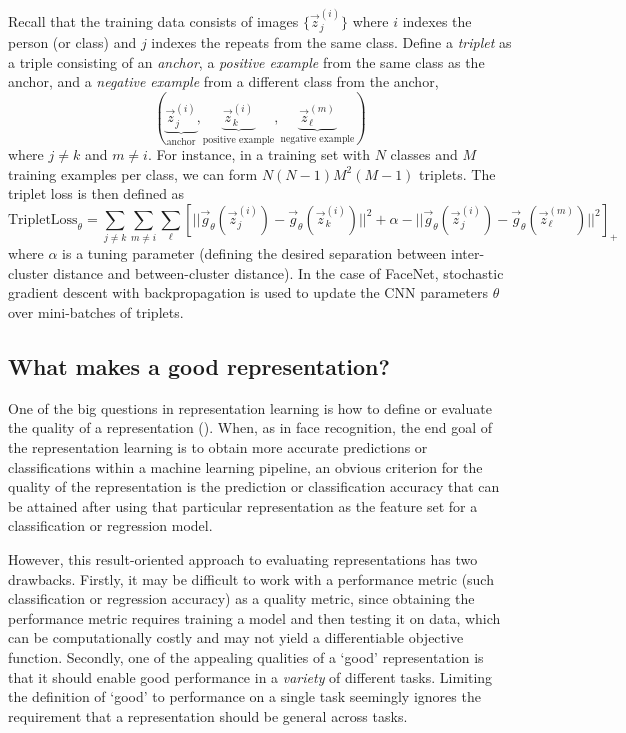 Recall that the training data consists of images $\{\vec{z}_j^{(i)}\}$
where $i$ indexes the person (or class) and $j$ indexes the repeats
from the same class.  Define a \emph{triplet} as a triple consisting
of an \emph{anchor}, a \emph{positive example} from the same class as
the anchor, and a \emph{negative example} from a different class from
the anchor,
\[
(\underbrace{\vec{z}_j^{(i)}}_{\text{anchor}}, \underbrace{\vec{z}_k^{(i)}}_{\text{positive example}}, \underbrace{\vec{z}_\ell^{(m)}}_{\text{negative example}})
\]
where $j \neq k$ and $m \neq i$.  For instance, in a training set with
$N$ classes and $M$ training examples per class, we can form
$N(N-1)M^2(M-1)$ triplets.  The triplet loss is then defined as
\[
\text{TripletLoss}_{\theta} = \sum_{j \neq k} \sum_{m \neq i} \sum_\ell 
[||\vec{g}_\theta(\vec{z}_j^{(i)}) - \vec{g}_\theta(\vec{z}_k^{(i)})||^2 + \alpha
 - ||\vec{g}_\theta(\vec{z}_j^{(i)}) - \vec{g}_\theta(\vec{z}_\ell^{(m)})||^2]_+
\]
where $\alpha$ is a tuning parameter (defining the desired separation
between inter-cluster distance and between-cluster distance).  In the
case of FaceNet, stochastic gradient descent with backpropagation is
used to update the CNN parameters $\theta$ over mini-batches of
triplets.

\subsection{What makes a good representation?}

One of the big questions in representation learning is how to define
or evaluate the quality of a
representation (\cite{bengio2013representation}).  When, as in face
recognition, the end goal of the representation learning is to obtain
more accurate predictions or classifications within a machine learning
pipeline, an obvious criterion for the quality of the representation
is the prediction or classification accuracy that can be attained
after using that particular representation as the feature set for a
classification or regression model.

However, this result-oriented approach to evaluating representations
has two drawbacks.  Firstly, it may be difficult to work with a
performance metric (such classification or regression accuracy) as a
quality metric, since obtaining the performance metric requires
training a model and then testing it on data, which can be
computationally costly and may not yield a differentiable objective
function.  Secondly, one of the appealing qualities of a `good'
representation is that it should enable good performance in a
\emph{variety} of different tasks.  Limiting the definition of `good'
to performance on a single task seemingly ignores the requirement that
a representation should be general across tasks.

